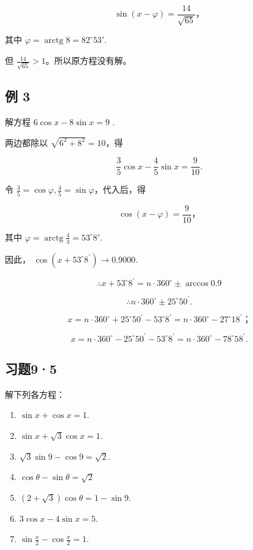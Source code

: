 \[
\sin (x - \varphi) = \frac {14}{\sqrt {65}}\text{，}
\]

其中 \(\varphi = \operatorname{arctg} 8 = 82^{\circ}53'\).

但 \(\frac{14}{\sqrt{65}} > 1\)。所以原方程没有解。

\subsection{例 3}

解方程 \(6 \cos x - 8 \sin x = 9\) .

 两边都除以 \(\sqrt{6^2 + 8^2} = 10\)，得

\[
\frac {3}{5} \cos x - \frac {4}{5} \sin x = \frac {9}{10}.
\]

令
\(\frac{3}{5} = \cos \varphi, \frac{4}{5} = \sin \varphi\)，代入后，得

\[
\cos (x - \varphi) = \frac {9}{10}\text{，}
\]

其中 \(\varphi = \operatorname{arctg} \frac{4}{3} = 53^{\circ}8'\).

因此， \(\cos (x + 53^{\circ}8^{\prime})\rightarrow 0.9000.\)

\[
\therefore x + 53 ^{\circ} 8 ^{\prime} = n \cdot 360 ^{\circ} \pm \arccos 0.9
\]

\[
\therefore n \cdot 360 ^{\circ} \pm 25 ^{\circ} 50 ^{\prime}.
\]

\[
x = n \cdot 360 ^{\circ} + 25 ^{\circ} 50 ^{\prime} - 53 ^{\circ} 8 ^{\prime} = n \cdot 360 ^{\circ} - 27 ^{\circ} 18 ^{\prime}\text{；}
\]

\[
x = n \cdot 360 ^{\circ} - 25 ^{\circ} 50 ^{\prime} - 53 ^{\circ} 8 ^{\prime} = n \cdot 360 ^{\circ} - 78 ^{\circ} 58 ^{\prime}.
\]

\subsection{习题9·5}

解下列各方程：

\begin{enumerate}
\item
  \(\sin x + \cos x = 1.\)
\item
  \(\sin x + \sqrt{3}\cos x = 1.\)
\item
  \(\sqrt{3}\sin 9 - \cos 9 = \sqrt{2}\).
\item
  \(\cos\theta-\sin\theta=\sqrt{2}\)
\item
  \((2 + \sqrt{3})\cos \theta = 1 - \sin 9.\)
\item
  \(3\cos x - 4\sin x = 5.\)
\item
  \(\sin\frac{x}{2}-\cos\frac{x}{2}=1.\)
\end{enumerate}

